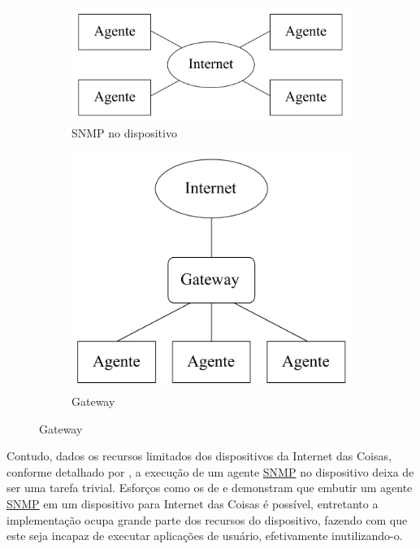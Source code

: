 \documentclass[twoside,english,brazilian]{UNISINOSmonografia}
\begin{document}
\begin{figure}
    \caption{Arquiteturas de Integração SNMP--IoT}
	\label{fig:arch}
	\centering
    \begin{subfigure}[b]{0.4\textwidth}
        \includegraphics[width=\textwidth,keepaspectratio=true]{arch_snmp}
		\caption{SNMP no dispositivo}
		\vspace{.2\textwidth}
    \end{subfigure}
\hspace{.1\textwidth}
    \begin{subfigure}[b]{0.4\textwidth}
        \includegraphics[width=\textwidth,keepaspectratio=true]{arch_gateway}
		\caption{Gateway}
    \end{subfigure}
\end{figure}


Contudo, dados os recursos limitados dos dispositivos da Internet das Coisas, 
conforme detalhado por , a execução de um agente \hyperref[siglas]{SNMP} 
no dispositivo deixa de ser uma tarefa trivial.
Esforços como os de  e  demonstram 
que embutir um agente \hyperref[siglas]{SNMP} em um dispositivo para Internet das Coisas é 
possível, entretanto a implementação ocupa grande parte dos recursos do 
dispositivo, fazendo com que este seja incapaz de executar aplicações de 
usuário, efetivamente inutilizando-o.
\end{document}
